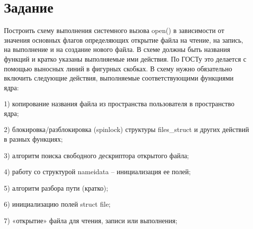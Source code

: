 \newpage
\section*{Задание}

Построить схему выполнения системного вызова open() в зависимости от значения основных флагов определяющих открытие файла на чтение, на запись, на выполнение и на создание нового файла. В схеме должны быть названия функций и кратко указаны выполняемые ими действия. По ГОСТу это делается с помощью выносных линий в фигурных скобках.
В схему нужно обязательно включить следующие действия, выполняемые соответствующими функциями ядра:

1)	копирование названия файла из пространства пользователя в пространство ядра;

2)	блокировка/разблокировка (spinlock) структуры files\_struct и других действий в разных функциях;

3)	алгоритм поиска свободного дескриптора открытого файла;

4)	работу со структурой nameidata – инициализация ее полей;

5)	алгоритм разбора пути (кратко);

6)	инициализацию полей struct file;

7)	«открытие» файла для чтения, записи или выполнения; 

